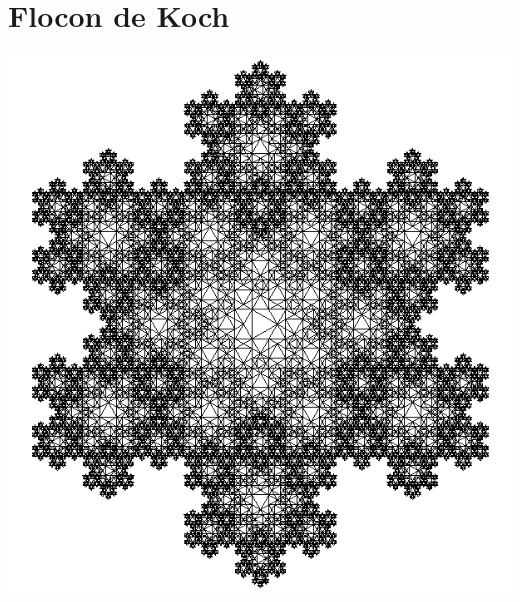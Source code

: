 \documentclass[a4paper, 12pt]{report}
\begin{document}
		\section{Flocon de Koch} 
			\begin{center}
				\includegraphics[scale=0.4]{Images/flocon}
			\end{center}
\end{document}
